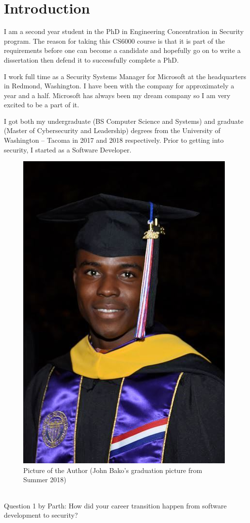 \section{\large \bf Introduction}

I am a second year student in the PhD in Engineering \– Concentration in Security program. The reason for taking this CS6000 course is that it is part of the requirements before one can become a candidate and hopefully go on to write a dissertation then defend it to successfully complete a PhD.

I work full time as a Security Systems Manager for Microsoft at the headquarters in Redmond, Washington. I have been with the company for approximately a year and a half. Microsoft has always been my dream company so I am very excited to be a part of it.

I got both my undergraduate (BS Computer Science and Systems) and graduate (Master of Cybersecurity and Leadership) degrees from the University of Washington – Tacoma in 2017 and 2018 respectively. Prior to getting into security, I started as a Software Developer.

\begin{figure}
  \includegraphics[width=\linewidth]{jbako.jpg}
  \caption{Picture of the Author (John Bako's graduation picture from Summer 2018)}
\end{figure}

\\
Question 1 by Parth: How did your career transition happen from software development to security? \\ 